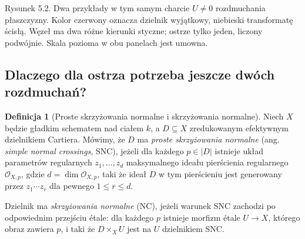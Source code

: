 \documentclass[11pt,a4paper,openany]{report}
\numberwithin{equation}{section}
\theoremstyle{plain}
\theoremstyle{definition}
\newtheorem{definicja}[twierdzenie]{Definicja}
\theoremstyle{remark}
\begin{document}
\begin{center}

{\small Rysunek 5.2. Dwa przykłady w tym samym charcie $U\ne0$ rozdmuchania płaszczyzny. Kolor czerwony oznacza dzielnik wyjątkowy, niebieski transformatę ścisłą. Węzeł ma dwa różne kierunki styczne; ostrze tylko jeden, liczony podwójnie. Skala pozioma w obu panelach jest umowna.}\par
\end{center}

\subsection{Dlaczego dla ostrza potrzeba jeszcze dwóch rozdmuchań?}

\begin{definicja}[Proste skrzyżowania normalne i skrzyżowania normalne]
\label{def:ga5-snc}
Niech $X$ będzie gładkim schematem nad ciałem $k$, a
$D\subseteq X$ zredukowanym efektywnym dzielnikiem Cartiera.
Mówimy, że $D$ ma \emph{proste skrzyżowania normalne}
(ang. \emph{simple normal crossings}, SNC), jeżeli dla każdego
$p\in |D|$ istnieje układ parametrów regularnych
$z_1,\ldots,z_d$ maksymalnego ideału pierścienia
regularnego $\mathcal O_{X,p}$, gdzie
$d=\dim\mathcal O_{X,p}$, taki że ideał $D$ w tym
pierścieniu jest generowany przez $z_1\cdots z_r$
dla pewnego $1\le r\le d$.

Dzielnik ma \emph{skrzyżowania normalne} (NC), jeżeli
warunek SNC zachodzi po odpowiednim przejściu étale:
dla każdego $p$ istnieje morfizm étale $U\to X$,
którego obraz zawiera $p$, i taki że $D\times_XU$ jest
na $U$ dzielnikiem SNC.
\end{definicja}
\end{document}
